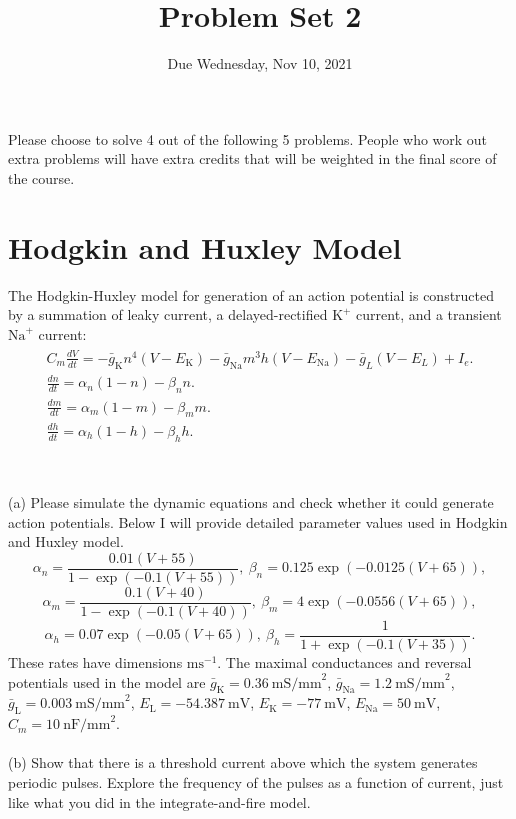 \documentclass{article}
\title{Problem Set 2}
\date{Due Wednesday, Nov 10, 2021}
\begin{document}
\maketitle
Please choose to solve 4 out of the following 5 problems. People who work out extra problems will have extra credits that will be weighted in the final score of the course. 

\section*{Hodgkin and Huxley Model}

The Hodgkin-Huxley model for generation of an action potential is constructed by a summation of leaky current, a delayed-rectified $\textrm{K}^{+}$ current, and a transient $\textrm{Na}^{+}$ current:
\begin{eqnarray}
\begin{aligned}
C_{m}\frac{dV}{dt}=-\bar{g}_{\textrm{K}}n^{4}(V-E_{\textrm{K}})-\bar{g}_{\textrm{Na}}m^{3}h(V-E_{\textrm{Na}})-\bar{g}_L(V-E_L)+I_{e}.  \\  
\frac{dn}{dt}=\alpha_n (1-n) - \beta_n n. \\
\frac{dm}{dt}=\alpha_m(1-m) - \beta_m m. \\
\frac{dh}{dt}=\alpha_h(1-h) - \beta_h h. \\
\end{aligned}
\end{eqnarray}
\\
\\
(a) Please simulate the dynamic equations and check whether it could generate action potentials. Below I will provide detailed parameter values used in Hodgkin and Huxley model. 
\[\alpha_n=\frac{0.01(V+55)}{1-\exp(-0.1(V+55))}, \ \beta_n=0.125\exp(-0.0125(V+65)),\]
\[\alpha_m=\frac{0.1(V+40)}{1-\exp(-0.1(V+40))},\ \beta_m=4\exp(-0.0556(V+65)),\]
\[\alpha_h=0.07\exp(-0.05(V+65)), \ \beta_h=\frac{1}{1+\exp(-0.1(V+35))}. \]
These rates have dimensions $\textrm{ms}^{-1}$. The maximal conductances and reversal potentials used in the model are $\bar{g}_{\textrm{K}} = 0.36\  \textrm{mS/mm}^2$, $\bar{g}_{\textrm{Na}} = 1.2\  \textrm{mS/mm}^2$,   $\bar{g}_{\textrm{L}} = 0.003\  \textrm{mS/mm}^2$, $E_\textrm{L} = -54.387\  \textrm{mV}$, $E_\textrm{K} = -77\  \textrm{mV}$, $E_\textrm{Na} = 50\  \textrm{mV}$, $C_m = 10\ \textrm{nF/mm}^2$.
\\
\\
(b) Show that there is a threshold current above which the system generates periodic pulses. Explore the frequency of the pulses as a function of current, just like what you did in the integrate-and-fire model.
\end{document}

